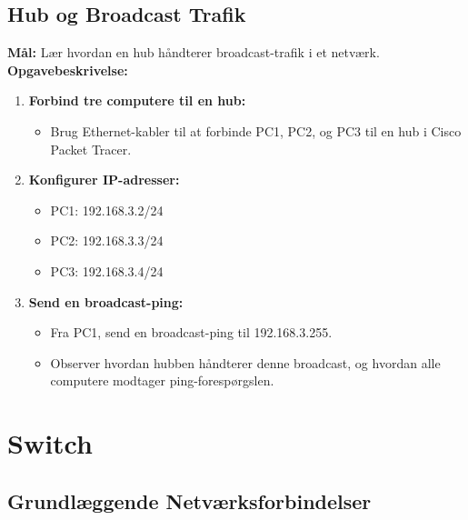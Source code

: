 \subsection{Hub og Broadcast Trafik}
\textbf{Mål:} Lær hvordan en hub håndterer broadcast-trafik i et netværk.
\newline\newline\noindent
\textbf{Opgavebeskrivelse:}
\begin{enumerate}
	\item \textbf{Forbind tre computere til en hub:}
	\begin{itemize}
		\item Brug Ethernet-kabler til at forbinde PC1, PC2, og PC3 til en hub i Cisco Packet Tracer.
	\end{itemize}
	\item \textbf{Konfigurer IP-adresser:}
	\begin{itemize}
		\item PC1: 192.168.3.2/24
		\item PC2: 192.168.3.3/24
		\item PC3: 192.168.3.4/24
	\end{itemize}
	\item \textbf{Send en broadcast-ping:}
	\begin{itemize}
		\item Fra PC1, send en broadcast-ping til 192.168.3.255.
		\item Observer hvordan hubben håndterer denne broadcast, og hvordan alle computere modtager ping-forespørgslen.
	\end{itemize}
\end{enumerate}


\section{Switch}
\subsection{Grundlæggende Netværksforbindelser}
